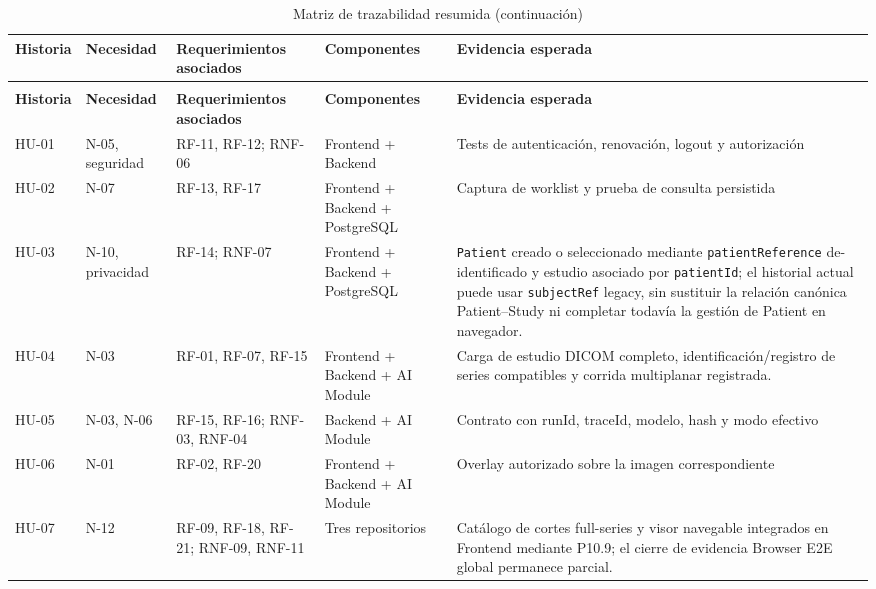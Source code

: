 {\scriptsize
\setlength{\LTleft}{0pt}
\setlength{\LTright}{0pt}
\setlength{\tabcolsep}{2pt}
\renewcommand{\arraystretch}{1.18}
\begin{longtable}{>{\raggedright\arraybackslash}p{} >{\raggedright\arraybackslash}p{} >{\raggedright\arraybackslash}p{} >{\raggedright\arraybackslash}p{} >{\raggedright\arraybackslash}p{}}
\caption{Matriz de trazabilidad resumida}\label{tab:req-trazabilidad}\\
\hline
\textbf{Historia} & \textbf{Necesidad} & \textbf{Requerimientos asociados} & \textbf{Componentes} & \textbf{Evidencia esperada} \\
\hline
\endfirsthead
\caption[]{Matriz de trazabilidad resumida (continuación)}\\
\hline
\textbf{Historia} & \textbf{Necesidad} & \textbf{Requerimientos asociados} & \textbf{Componentes} & \textbf{Evidencia esperada} \\
\hline
\endhead
\hline
\endfoot
HU-01 & N-05, seguridad & RF-11, RF-12; RNF-06 & Frontend + Backend & Tests de autenticación, renovación, logout y autorización \\
HU-02 & N-07 & RF-13, RF-17 & Frontend + Backend + PostgreSQL & Captura de worklist y prueba de consulta persistida \\
HU-03 & N-10, privacidad & RF-14; RNF-07 & Frontend + Backend + PostgreSQL & \texttt{Patient} creado o seleccionado mediante \texttt{patientReference} de-identificado y estudio asociado por \texttt{patientId}; el historial actual puede usar \texttt{subjectRef} legacy, sin sustituir la relación canónica Patient--Study ni completar todavía la gestión de Patient en navegador. \\
HU-04 & N-03 & RF-01, RF-07, RF-15 & Frontend + Backend + AI Module & Carga de estudio DICOM completo, identificación/registro de series compatibles y corrida multiplanar registrada. \\
HU-05 & N-03, N-06 & RF-15, RF-16; RNF-03, RNF-04 & Backend + AI Module & Contrato con runId, traceId, modelo, hash y modo efectivo \\
HU-06 & N-01 & RF-02, RF-20 & Frontend + Backend + AI Module & Overlay autorizado sobre la imagen correspondiente \\
HU-07 & N-12 & RF-09, RF-18, RF-21; RNF-09, RNF-11 & Tres repositorios & Catálogo de cortes full-series y visor navegable integrados en Frontend mediante P10.9; el cierre de evidencia Browser E2E global permanece parcial. \\

\end{longtable}}
